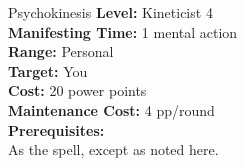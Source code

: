 {Psychokinesis}
{
	\textbf{Level:}
	Kineticist 4\\
	\textbf{Manifesting Time:}
	1 mental action\\
	\textbf{Range:}
	Personal\\
	\textbf{Target:}
	You\\
	\textbf{Cost:}
	20 power points\\
	\textbf{Maintenance Cost:}
	4 pp/round\\
	\textbf{Prerequisites:}
	\\
}
{
	As the  spell, except as noted here.
}